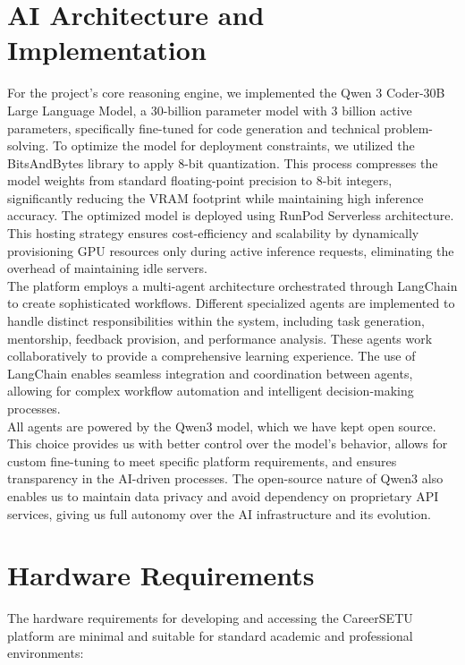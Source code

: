 \documentclass[12pt,a4paper]{report}
\begin{document}
\section{AI Architecture and Implementation}

For the project's core reasoning engine, we implemented the Qwen 3 Coder-30B Large Language Model, a 30-billion parameter model with 3 billion active parameters, specifically fine-tuned for code generation and technical problem-solving. To optimize the model for deployment constraints, we utilized the BitsAndBytes library to apply 8-bit quantization. This process compresses the model weights from standard floating-point precision to 8-bit integers, significantly reducing the VRAM footprint while maintaining high inference accuracy. The optimized model is deployed using RunPod Serverless architecture. This hosting strategy ensures cost-efficiency and scalability by dynamically provisioning GPU resources only during active inference requests, eliminating the overhead of maintaining idle servers.\\[0.1cm]

The platform employs a multi-agent architecture orchestrated through LangChain to create sophisticated workflows. Different specialized agents are implemented to handle distinct responsibilities within the system, including task generation, mentorship, feedback provision, and performance analysis. These agents work collaboratively to provide a comprehensive learning experience. The use of LangChain enables seamless integration and coordination between agents, allowing for complex workflow automation and intelligent decision-making processes.\\[0.1cm]

All agents are powered by the Qwen3 model, which we have kept open source. This choice provides us with better control over the model's behavior, allows for custom fine-tuning to meet specific platform requirements, and ensures transparency in the AI-driven processes. The open-source nature of Qwen3 also enables us to maintain data privacy and avoid dependency on proprietary API services, giving us full autonomy over the AI infrastructure and its evolution.

\section{Hardware Requirements}

The hardware requirements for developing and accessing the CareerSETU platform are
minimal and suitable for standard academic and professional environments:
\end{document}
